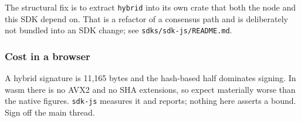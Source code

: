\documentclass[11pt,a4paper]{article}
\begin{document}
The structural fix is to extract \texttt{hybrid} into its own crate that both the
node and this SDK depend on. That is a refactor of a consensus path and is
deliberately not bundled into an SDK change; see \texttt{sdks/sdk-js/README.md}.

\subsubsection{Cost in a browser}

A hybrid signature is 11,165 bytes and the hash-based half dominates
signing. In wasm there is no AVX2 and no SHA extensions, so expect
materially worse than the native figures. \texttt{sdk-js} measures it and reports;
nothing here asserts a bound. Sign off the main thread.
\end{document}
